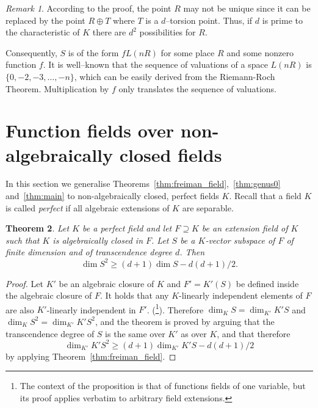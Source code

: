 \documentclass{article}
\theoremstyle{plain}
\newtheorem{thm}{Theorem}[section]
\theoremstyle{definition}
\theoremstyle{remark}
\newtheorem{rema}[thm]{Remark}
\renewcommand{\geq}{\geqslant}
\begin{document}
\begin{rema}
  According to the proof, the point $R$ may not be unique since it can
  be replaced by the point $R \oplus T$ where $T$ is a $d$--torsion
  point. Thus, if $d$ is prime to the characteristic of $K$ there are
  $d^2$ possibilities for $R$.
\end{rema}

Consequently, $S$ is of the form $f L(nR)$
for some place $R$ and some nonzero function $f$. It is well--known
that the sequence of valuations of a space $L(nR)$ is $\{0, -2, -3, \ldots, -n\}$,
which can be easily derived from the Riemann-Roch
Theorem. Multiplication by $f$ only translates the sequence of valuations.

\section{{Function fields over non-algebraically closed
  fields}}\label{sec:perfect}

{
In this section we generalise Theorems~\ref{thm:freiman_field},~\ref{thm:genus0} and~\ref{thm:main} to
non-algebraically closed, perfect fields $K$.
Recall that a field $K$ is called {\em perfect} if all
  algebraic extensions of $K$ are separable.}



{
\begin{thm}\label{thm:freiman_perfect}
    Let $K$ be a perfect
  field and let $F \supseteq K$ be
  an extension field of $K$ such that $K$
  is algebraically closed in $F$. Let $S$ be a $K$-vector
  subspace of $F$ of finite dimension and of transcendence degree $d$.
  Then
  $$\dim S^2\geq (d+1)\dim S -d(d+1)/2.$$
\end{thm}
}

{
\begin{proof}
  Let $K'$ be an algebraic closure of $K$ and $F'=K'(S)$ be defined
  inside the algebraic closure of $F$.  It holds that any $K$-linearly
  independent elements of $F$ are also $K'$-linearly independent in
  $F'$.  (\cite[Proposition III.6.1]{Stichtenoth}\footnote{The context
    of the proposition is that of functions fields of one variable,
    but its proof applies verbatim to arbitrary field extensions.}).
  Therefore $\dim_KS=\dim_{K'}K'S$ and $\dim_KS^2=\dim_{K'}K'S^2$, and
  the theorem is proved by
  arguing that the transcendence degree of $S$ is the same over $K'$
  as over $K$, and that therefore
$$\dim_{K'}K'S^2\geq (d+1)\dim_{K'}K'S -d(d+1)/2$$
by applying Theorem~\ref{thm:freiman_field}.
\end{proof}
}
\end{document}
